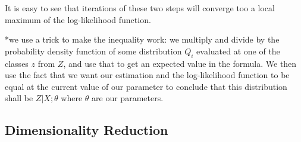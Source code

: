 \documentclass{article}
\begin{document}
\begin{enumerate}
It is easy to see that iterations of these two steps will converge too a local maximum of the log-likelihood function.

*we use a trick to make the inequality work: we multiply and divide by the probability density function of some distribution $Q_i$ evaluated at one of the classes $z$ from $Z$, and use that to get an expected value in the formula.
We then use the fact that we want our estimation and the log-likelihood function to be equal at the current value of our parameter to conclude that this distribution shall be $Z | X ; \theta$ where $\theta$ are our parameters.

\end{enumerate}

\subsection{Dimensionality Reduction}
\end{document}
